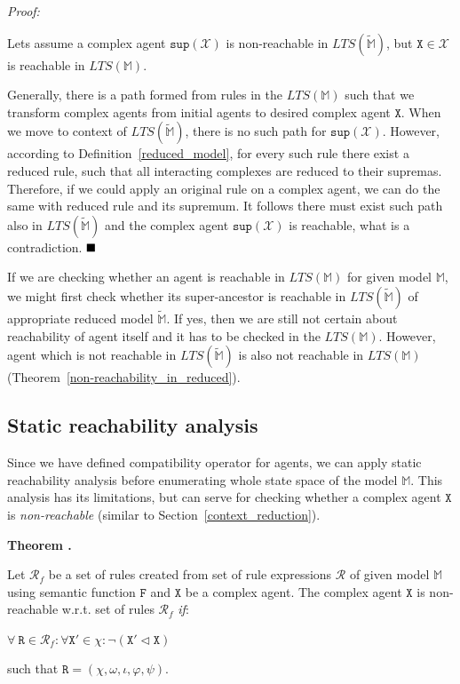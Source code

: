 \documentclass[12pt]{fithesis2}
\newcounter{counter}[section]
\renewcommand{\thecounter}{\thesection.\arabic{counter}}
\newenvironment{proof}{\noindent\emph{Proof:~ }\nopagebreak \begin{itshape}}{\end{itshape}\bigskip}
\newenvironment{theorem}{\bigskip\refstepcounter{counter}\noindent\textbf{Theorem \thecounter }\nopagebreak \begin{itshape}}{\end{itshape}\medskip}
\newcommand*{\QEDA}{\hfill\ensuremath{\blacksquare}}%
\begin{document}
\begin{proof}
Lets assume a complex agent $\mathtt{sup}(\mathscr{X})$ is non-reachable in $LTS(\widetilde{\mathds{M}})$, but $\mathtt{X} \in \mathscr{X}$ is reachable in $LTS(\mathds{M})$.

Generally, there is a path formed from rules in the $LTS(\mathds{M})$ such that we transform complex agents from initial agents to desired complex agent $\mathtt{X}$. When we move to context of $LTS(\widetilde{\mathds{M}})$, there is no such path for $\mathtt{sup}(\mathscr{X})$. However, according to Definition~\ref{reduced_model}, for every such rule there exist a reduced rule, such that all interacting complexes are reduced to their supremas. Therefore, if we could apply an original rule on a complex agent, we can do the same with reduced rule and its supremum. It follows there must exist such path also in $LTS(\widetilde{\mathds{M}})$ and the complex agent $\mathtt{sup}(\mathscr{X})$ is reachable, what is a contradiction. $\QEDA$
\end{proof}

If we are checking whether an agent is reachable in $LTS(\mathds{M})$ for given model $\mathds{M}$, we might first check whether its super-ancestor is reachable in $LTS(\widetilde{\mathds{M}})$ of appropriate reduced model $\widetilde{\mathds{M}}$. If yes, then we are still not certain about reachability of agent itself and it has to be checked in the $LTS(\mathds{M})$. However, agent which is not reachable in $LTS(\widetilde{\mathds{M}})$ is also not reachable in $LTS(\mathds{M})$ (Theorem~\ref{non-reachability_in_reduced}).

\subsection{Static reachability analysis}
\label{static_reachability_analysis}

Since we have defined compatibility operator for agents, we can apply static reachability analysis before enumerating whole state space of the model $\mathds{M}$. This analysis has its limitations, but can serve for checking whether a complex agent $\mathtt{X}$ is \emph{non-reachable} (similar to Section~\ref{context_reduction}).

\begin{theorem}
\label{static_reach}
Let $\mathcal{R}_f$ be a set of rules created from set of rule expressions $\mathcal{R}$ of given model $\mathds{M}$ using semantic function $\mathtt{F}$ and $\mathtt{X}$ be a complex agent. The complex agent $\mathtt{X}$ is non-reachable w.r.t. set of rules $\mathcal{R}_f$ \emph{if}:

\begin{center}
$\forall~ \mathtt{R} \in \mathcal{R}_f: \forall \mathtt{X}' \in \chi: \neg (\mathtt{X}' \lhd \mathtt{X})$
\end{center}

\noindent such that $\mathtt{R} = (\chi, \omega, \iota, \varphi, \psi)$.
\end{theorem}
\end{document}
